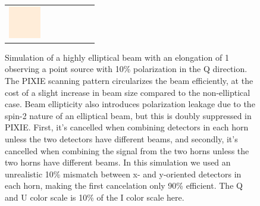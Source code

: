 \documentclass{article}
\begin{document}
\begin{figure}
\begin{tabular}{rm{11mm}m{11mm}m{11mm}m{11mm}m{11mm}m{11mm}}
		\includegraphics[height=14mm]{plots/circular_srcs_sb_tot_crop_2.png}
	\end{tabular}
	\caption{Simulation of a highly elliptical beam with an elongation of 1
	observing a point source with 10\% polarization in the Q direction.
	The PIXIE scanning pattern circularizes the beam efficiently, at the cost
	of a slight increase in beam size compared to the non-elliptical case.
	Beam ellipticity also introduces polarization leakage due to the spin-2
	nature of an elliptical beam, but this is doubly suppressed in PIXIE.
	First, it's cancelled when combining detectors in each horn unless
	the two detectors have different beams, and secondly, it's cancelled
	when combining the signal from the two horns unless the two horns
	have different beams. In this simulation we used an unrealistic
	10\% mismatch between x- and y-oriented detectors in each horn, making
	the first cancelation only 90\% efficient. The Q and U color scale is
	10\% of the I color scale here.}
	\label{fig:src_leak}
\end{figure}
\end{document}
